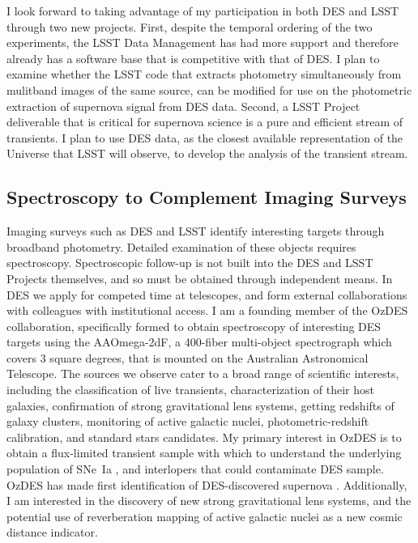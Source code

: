 \documentclass{article}
\begin{document}
I look forward to taking advantage of my participation in both DES and LSST through two new projects.
First, despite the temporal ordering of the two experiments, the LSST Data Management has had more support and therefore
already has a software base that is competitive with that of DES.  I plan to examine whether the LSST code that extracts photometry simultaneously from mulitband images
of the same source, can be modified for use on the photometric extraction of supernova signal from DES data.
Second, a LSST Project deliverable that is critical for supernova science is a pure and efficient stream of transients.
I plan to use
DES data, as the closest available representation of the Universe that LSST will observe, to develop the 
analysis of the transient stream.


\subsection{Spectroscopy to Complement Imaging Surveys}
Imaging surveys such as DES and LSST identify interesting targets through broadband photometry.
Detailed examination of these objects requires spectroscopy. Spectroscopic follow-up is not
built into the DES and LSST Projects themselves, and so must be obtained through independent means.
In DES we apply for competed time at
telescopes, and form external collaborations with colleagues with institutional access.  I am a founding member of the OzDES collaboration, specifically formed to obtain spectroscopy
of interesting DES targets using the AAOmega-2dF, a 400-fiber multi-object spectrograph which covers
3 square degrees, that is mounted on the Australian Astronomical Telescope.
The sources we observe cater to a broad range of scientific interests,
including the classification of live transients, characterization of their host galaxies, confirmation
of strong gravitational lens systems, getting redshifts of galaxy clusters, monitoring of active galactic nuclei, photometric-redshift
calibration,
and
standard stars candidates.  My primary interest in OzDES is to obtain a flux-limited transient sample with which to understand the
underlying population of SNe~Ia  \cite{2006MNRAS.370..933J}, and interlopers that could contaminate DES sample.  OzDES has made first identification of DES-discovered supernova \cite{2013ATel.5568....1C}.
Additionally, I am interested in the discovery of new strong gravitational lens systems, and the potential use
of reverberation mapping of active galactic nuclei as a new cosmic distance indicator.
\end{document}

